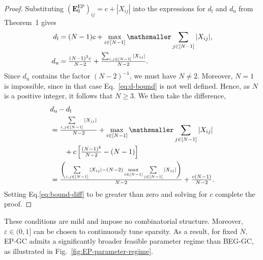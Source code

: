 \documentclass[lettersize,journal]{IEEEtran}
\newcommand{\GEP}{\boldsymbol{E}^{\mathrm{EP}}}
\begin{document}
\begin{proof}[Proof]
Substituting $(\GEP_0)_{ij} = c + |X_{ij}|$ into the expressions for $d_{\mathrm{l}}$
and $d_{\mathrm{u}}$ from Theorem~1 gives
\begin{align*}
    d_{\mathrm{l}}
         &= (N-1)c +  \max_{i\in[N-1]}\mathsmaller\sum\limits_{j\in[N-1]}|X_{ij}|, \\
    d_{\mathrm{u}}
         &= \tfrac{(N-1)^2 c}{N-2} + \tfrac{ \sum_{i,j\in[N-1]}|X_{ij}|}{N-2}.
\end{align*}
Since $d_{\mathrm{u}}$ contains the factor $(N-2)^{-1}$, we must have $N \neq 2$. Moreover, $N=1$ is impossible, since in that case Eq.~\eqref{eq:d-bound} is not well defined. Hence, as $N$ is a positive integer, it follows that $N \ge 3$.
We then take the difference,
\begin{align}
    &d_{\mathrm{u}} - d_{\mathrm{l}}\notag\\
    &=\tfrac{ \sum\limits_{i,j\in[N-1]}|X_{ij}|}{N-2} +  \max_{i\in[N-1]}\mathsmaller\sum\limits_{j\in[N-1]}|X_{ij}|\notag\\
    &\qquad+c\left[\tfrac{(N-1)^2 }{N-2} - (N-1)\right]\notag\\
    &= \tfrac{\left(\sum\limits_{i,j\in[N-1]}|X_{ij}| - (N-2)\max\limits_{i\in[N-1]}\sum\limits_{j\in[N-1]}|X_{ij}|\right)}{N-2}+ \tfrac{c(N-1)}{N-2}.
    \label{eq:bound-diff}
\end{align}
Setting Eq.\eqref{eq:bound-diff} to be greater than zero and solving for $c$ complete the proof.
\end{proof}
    
These conditions are mild and impose no combinatorial structure. Moreover, $\varepsilon \in (0,1]$ can be chosen to continuously tune sparsity. As a result, for fixed $N$, EP-GC admits a significantly broader feasible parameter regime than BEG-GC, as illustrated in Fig.~\ref{fig:EP-parameter-regime}.
\end{document}
